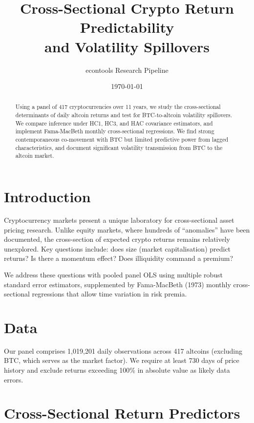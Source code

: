 \documentclass[12pt,a4paper]{article}
\title{Cross-Sectional Crypto Return Predictability\\and Volatility Spillovers}
\author{econtools Research Pipeline}
\date{\today}
\begin{document}
\maketitle

\begin{abstract}
Using a panel of 417 cryptocurrencies over 11 years,
we study the cross-sectional determinants of daily altcoin returns and
test for BTC-to-altcoin volatility spillovers. We compare inference
under HC1, HC3, and HAC covariance estimators, and implement
Fama-MacBeth monthly cross-sectional regressions. We find strong
contemporaneous co-movement with BTC but limited predictive power
from lagged characteristics, and document significant volatility
transmission from BTC to the altcoin market.
\end{abstract}

\section{Introduction}

Cryptocurrency markets present a unique laboratory for cross-sectional
asset pricing research. Unlike equity markets, where hundreds of ``anomalies''
have been documented, the cross-section of expected crypto returns remains
relatively unexplored. Key questions include: does size (market capitalisation)
predict returns? Is there a momentum effect? Does illiquidity command a premium?

We address these questions with pooled panel OLS using multiple robust
standard error estimators, supplemented by Fama-MacBeth (1973) monthly
cross-sectional regressions that allow time variation in risk premia.

\section{Data}

Our panel comprises 1,019,201 daily observations across 417 altcoins
(excluding BTC, which serves as the market factor). We require at least
730 days of price history and exclude returns exceeding 100\% in absolute
value as likely data errors.

\section{Cross-Sectional Return Predictors}
\end{document}
